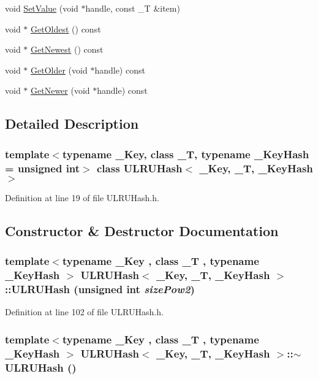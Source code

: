 \begin{CompactItemize}
\item 
void \hyperlink{class_u_l_r_u_hash_79fd6e7b60a39eb34eb0299c791d13b5}{SetValue} (void $\ast$handle, const \_\-T \&item)
\item 
void $\ast$ \hyperlink{class_u_l_r_u_hash_8c74e3de413f887f50782f56807261e5}{GetOldest} () const 
\item 
void $\ast$ \hyperlink{class_u_l_r_u_hash_059223a11ed06800c1a634e59197d8d7}{GetNewest} () const 
\item 
void $\ast$ \hyperlink{class_u_l_r_u_hash_b4b559b779b8c5872352e98b8ed3ed08}{GetOlder} (void $\ast$handle) const 
\item 
void $\ast$ \hyperlink{class_u_l_r_u_hash_87200ea360ecf08acd16f65883d7e3ae}{GetNewer} (void $\ast$handle) const 
\end{CompactItemize}


\subsection{Detailed Description}
\subsubsection*{template$<$typename \_\-Key, class \_\-T, typename \_\-KeyHash = unsigned int$>$ class ULRUHash$<$ \_\-Key, \_\-T, \_\-KeyHash $>$}



Definition at line 19 of file ULRUHash.h.

\subsection{Constructor \& Destructor Documentation}
\hypertarget{class_u_l_r_u_hash_64b8501e537b7805aab37bd0d45ee5d0}{
\subsubsection[{ULRUHash}]{\setlength{\rightskip}{0pt plus 5cm}template$<$typename \_\-Key , class \_\-T , typename \_\-KeyHash $>$ {\bf ULRUHash}$<$ \_\-Key, \_\-T, \_\-KeyHash $>$::{\bf ULRUHash} (unsigned int {\em sizePow2})}}
\label{class_u_l_r_u_hash_64b8501e537b7805aab37bd0d45ee5d0}




Definition at line 102 of file ULRUHash.h.\hypertarget{class_u_l_r_u_hash_b208b6347de680be8a5fb0ac3459c908}{
\subsubsection[{$\sim$ULRUHash}]{\setlength{\rightskip}{0pt plus 5cm}template$<$typename \_\-Key , class \_\-T , typename \_\-KeyHash $>$ {\bf ULRUHash}$<$ \_\-Key, \_\-T, \_\-KeyHash $>$::$\sim${\bf ULRUHash} ()}}
\label{class_u_l_r_u_hash_b208b6347de680be8a5fb0ac3459c908}




